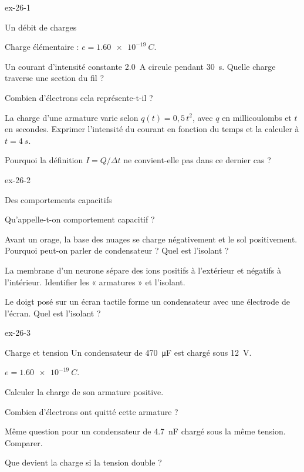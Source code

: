 \begin{blocLivre}{ex-26-1}
\begin{exercice}[1]{Un débit de charges}
\begin{donnees}
Charge élémentaire : $e=\qty{1,60e-19}{C}$.
\end{donnees}
\begin{questions}
\item Un courant d'intensité constante \qty{2,0}{A} circule pendant \qty{30}{s}. Quelle charge traverse une section du fil ?
\item Combien d'électrons cela représente-t-il ?
\item La charge d'une armature varie selon $q(t)=0{,}5\,t^2$, avec $q$ en millicoulombs et $t$ en secondes. Exprimer
l'intensité du courant en fonction du temps et la calculer à $t=\qty{4}{s}$.
\item Pourquoi la définition $I=Q/\Delta t$ ne convient-elle pas dans ce dernier cas ?
\end{questions}
\end{exercice}
\end{blocLivre}
\begin{blocLivre}{ex-26-2}
\begin{exercice}[1]{Des comportements capacitifs}
\begin{questions}
\item Qu'appelle-t-on comportement capacitif ?
\item Avant un orage, la base des nuages se charge négativement et le sol positivement. Pourquoi peut-on parler de
condensateur ? Quel est l'isolant ?
\item La membrane d'un neurone sépare des ions positifs à l'extérieur et négatifs à l'intérieur. Identifier les
« armatures » et l'isolant.
\item Le doigt posé sur un écran tactile forme un condensateur avec une électrode de l'écran. Quel est l'isolant ?
\end{questions}
\end{exercice}
\end{blocLivre}
\begin{blocLivre}{ex-26-3}
\begin{exercice}[1]{Charge et tension}
Un condensateur de \qty{470}{\micro F} est chargé sous \qty{12}{V}.
\begin{donnees}
$e=\qty{1,60e-19}{C}$.
\end{donnees}
\begin{questions}
\item Calculer la charge de son armature positive.
\item Combien d'électrons ont quitté cette armature ?
\item Même question pour un condensateur de \qty{4,7}{nF} chargé sous la même tension. Comparer.
\item Que devient la charge si la tension double ?
\end{questions}
\end{exercice}
\end{blocLivre}
